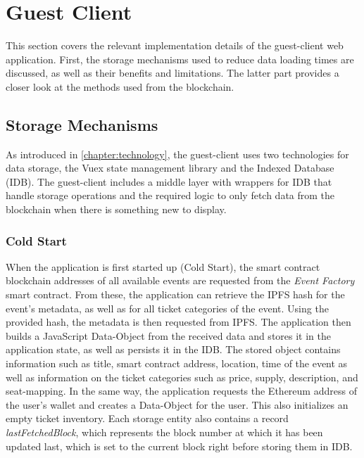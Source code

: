 \section{Guest Client}\label{section:imp:guest}

This section covers the relevant implementation details of the guest-client web application. First, the storage mechanisms used to reduce data loading times are discussed, as well as their benefits and limitations. The latter part provides a closer look at the methods used from the blockchain.

\subsection{Storage Mechanisms} %

As introduced in \ref{chapter:technology}, the guest-client uses two technologies for data storage, the Vuex state management library and the Indexed Database (IDB). The guest-client includes a middle layer with wrappers for IDB that handle storage operations and the required logic to only fetch data from the blockchain when there is something new to display. 

\subsubsection{Cold Start}

When the application is first started up (Cold Start), the smart contract blockchain addresses of all available events are requested from the \textit{Event Factory} smart contract. From these, the application can retrieve the IPFS hash for the event's metadata, as well as for all ticket categories of the event. Using the provided hash, the metadata is then requested from IPFS. The application then builds a JavaScript Data-Object from the received data and stores it in the application state, as well as persists it in the IDB. The stored object contains information such as title, smart contract address, location, time of the event as well as information on the ticket categories such as price, supply, description, and seat-mapping.
In the same way, the application requests the Ethereum address of the user's wallet and creates a Data-Object for the user. This also initializes an empty ticket inventory. 
Each storage entity also contains a record \textit{lastFetchedBlock}, which represents the block number at which it has been updated last, which is set to the current block right before storing them in IDB.

